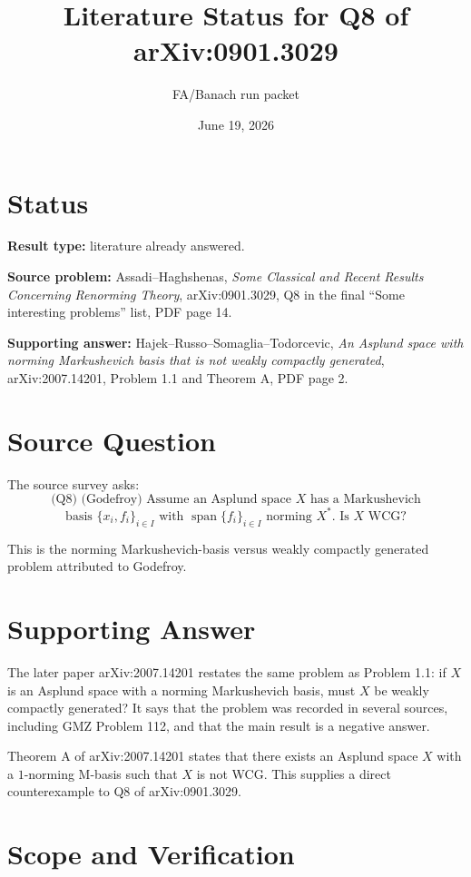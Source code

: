 \documentclass[11pt]{article}
\title{Literature Status for Q8 of arXiv:0901.3029}
\author{FA/Banach run packet}
\date{June 19, 2026}
\begin{document}
\maketitle

\section*{Status}

\textbf{Result type:} literature already answered.

\textbf{Source problem:} Assadi--Haghshenas, \emph{Some Classical and Recent
Results Concerning Renorming Theory}, arXiv:0901.3029, Q8 in the final
``Some interesting problems'' list, PDF page 14.

\textbf{Supporting answer:} Hajek--Russo--Somaglia--Todorcevic, \emph{An
Asplund space with norming Markushevich basis that is not weakly compactly
generated}, arXiv:2007.14201, Problem 1.1 and Theorem A, PDF page 2.

\section*{Source Question}

The source survey asks:
\[
\text{(Q8) (Godefroy) Assume an Asplund space }X\text{ has a Markushevich}
\]
\[
\text{basis }\{x_i,f_i\}_{i\in I}\text{ with }\operatorname{span}\{f_i\}_{i\in I}
\text{ norming }X^*.\text{ Is }X\text{ WCG?}
\]

This is the norming Markushevich-basis versus weakly compactly generated
problem attributed to Godefroy.

\section*{Supporting Answer}

The later paper arXiv:2007.14201 restates the same problem as Problem 1.1:
if \(X\) is an Asplund space with a norming Markushevich basis, must \(X\) be
weakly compactly generated? It says that the problem was recorded in several
sources, including GMZ Problem 112, and that the main result is a negative
answer.

Theorem A of arXiv:2007.14201 states that there exists an Asplund space \(X\)
with a \(1\)-norming M-basis such that \(X\) is not WCG. This supplies a direct
counterexample to Q8 of arXiv:0901.3029.

\section*{Scope and Verification}
\end{document}
